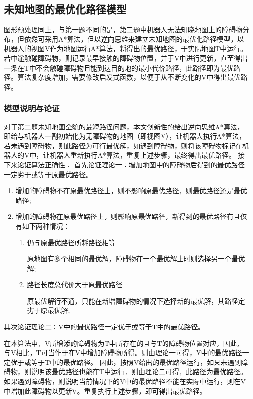 \documentclass[withoutpreface,bwprint]{cumcmthesis} %
\begin{document}
\subsection{未知地图的最优化路径模型}
图形预处理同上，与第一题不同的是，第二题中机器人无法知晓地图上的障碍物分布，但依然可采用A*算法，但以逆向思维来建立未知地图的最优化路径模型，以机器人的视图V作为地图运行A*算法，将得出的最优路径，于实际地图T中运行。若中途触碰障碍物，则记录最早接触的障碍物位置，并于V中进行更新，直至得出一条在T中不会触碰障碍物且能到达目的地的最小代价路径，此路径即为最优路径。算法复杂度增加，需要修改启发式函数，以便于从不断变化的V中得出最优路径。
\subsubsection{模型说明与论证}

对于第二题未知地图全貌的最短路径问题，本文创新性的给出逆向思维A*算法，即给与机器人一副初始化为无障碍物的地图（即视图V），让机器人执行A*算法，若未遇到障碍物，则此路径为可行最优解，如遇到障碍物，则将该障碍物标记在机器人的V中，让机器人重新执行A*算法，重复上述步骤，最终得出最优路径。
接下来论证算法正确性：
首先论证理论一：增加地图中的障碍物后得到的最优路径一定劣于或等于原最优路径。
\begin{enumerate}[itemindent=1em] 
    \renewcommand{\labelenumi}{\theenumi.}
    \item 增加的障碍物不在原最优路径上，则不影响原最优路径，则最优路径还是最优路径;
    
    \item 增加的障碍物在原最优路径上，则影响原最优路径，新得到的最优路径有且仅有如下两种情况：
    
    \begin{enumerate}[itemindent=1em] 
        \renewcommand{\labelenumi}{(\theenumi)}
        \item 仍与原最优路径所耗路径相等
        
        原地图有多个相同的最优解，障碍物在一个最优解上时则选择另一个最优解;
        \item 路径长度总代价大于原最优路径
        
        原最优解行不通，只能在新增障碍物的情况下选择新的最优解，其路径定劣于原最优解;
    \end{enumerate}
\end{enumerate}

其次论证理论二：V中的最优路径一定优于或等于T中的最优路径。

在本算法中，V所增添的障碍物为T中所存在的且与T的障碍物位置对应。因此，与V相比，T可当作于在V中增加障碍物所得。则由理论一可得，V中的最优路径一定优于或等于T中的最优路径。
因此，按照V给出的最优路径运行，如果未遇到障碍物，则说明该最优路径也能在T中运行，则由理论二可得，此路径为最优路径。如果遇到障碍物，则说明当前情况下的V中的最优路径不能在实际中运行，则在V中增加此障碍物以更新V。重复执行上述步骤，即可得出最优路径。
\end{document}
